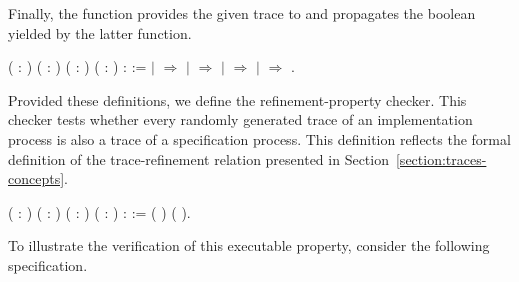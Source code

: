 Finally, the function  provides the given trace to  and propagates the boolean yielded by the latter function.

\begin{coqdoccode}
	\coqdocnoindent
	 \coqdoceol
	\coqdocindent{1.00em}
	( : )
	( : )
	( : )\coqdoceol
	\coqdocindent{1.00em}
	( :  ) :  :=\coqdoceol
	\coqdocindent{1.00em}
	  \coqdoceol
	\coqdocindent{1.00em}
	\ensuremath{|}  \ensuremath{\Rightarrow} \coqdoceol
	\coqdocindent{1.00em}
	\ensuremath{|}   \ensuremath{\Rightarrow}\coqdoceol
	\coqdocindent{2.00em}
	      \coqdoceol
	\coqdocindent{2.00em}
	\ensuremath{|}  \ensuremath{\Rightarrow} \coqdoceol
	\coqdocindent{2.00em}
	\ensuremath{|}   \ensuremath{\Rightarrow} \coqdoceol
	\coqdocindent{2.00em}
	\coqdoceol
	\coqdocindent{1.00em}
	.\coqdoceol
\end{coqdoccode}

Provided these definitions, we define the refinement-property checker. This checker tests whether every randomly generated trace of an implementation process is also a trace of a specification process. This definition reflects the formal definition of the trace-refinement relation presented in Section~\ref{section:traces-concepts}.

\begin{coqdoccode}
	\coqdocnoindent
	 \coqdoceol
	\coqdocindent{1.00em}
	( : )
	(  : )
	( : )
	( : ) :  :=\coqdoceol
	\coqdocindent{2.00em}
	 (   ) (   ).\coqdoceol
\end{coqdoccode}

To illustrate the verification of this executable property, consider the following \CSPcoq{} specification.

